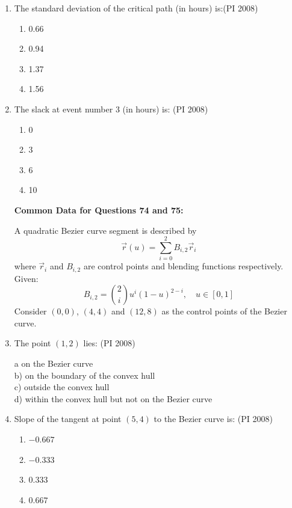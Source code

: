 \documentclass[journal,12pt,onecolumn]{IEEEtran}
\theoremstyle{remark}
\begin{document}
\begin{enumerate}
\item %
The standard deviation of the critical path (in hours) is:\hfill{(PI 2008)}  
\begin{multicols}{4}
    \begin{enumerate}
\item 0.66 
\item 0.94 
\item 1.37 
\item 1.56
 \end{enumerate}
\end{multicols}
\vspace{1cm}
\noindent
\item %
The slack at event number 3 (in hours) is: \hfill{(PI 2008)}
\begin{multicols}{4}
    \begin{enumerate}
\item 0 
\item 3
\item 6 
\item 10

 \end{enumerate}
\end{multicols}
\vspace{1cm}
\textbf{Common Data for Questions 74 and 75:}  

A quadratic Bezier curve segment is described by  
\[
\vec{r}(u) = \sum_{i=0}^{2} B_{i,2} \vec{r}_i
\]
where $\vec{r}_i$ and $B_{i,2}$ are control points and blending functions respectively.  
Given:  
\[
B_{i,2} = \binom{2}{i} u^i (1-u)^{2-i}, \quad u \in [0,1]
\]
Consider $(0,0)$, $(4,4)$ and $(12,8)$ as the control points of the Bezier curve.

\vspace{0.4cm}
\noindent
\item %
The point $(1,2)$ lies:  \hfill{(PI 2008)}

a on the Bezier curve \\
b) on the boundary of the convex hull \\
c) outside the convex hull \\
d) within the convex hull but not on the Bezier curve \\

\vspace{1cm}
\noindent
\item %
Slope of the tangent at point $(5,4)$ to the Bezier curve is: \hfill{(PI 2008)}
\begin{multicols}{4}
    \begin{enumerate}
\item  $-0.667$ 
\item $-0.333$ 
\item $0.333$
\item $0.667$


\end{enumerate}
\end{multicols}
\end{enumerate}
\end{document}

